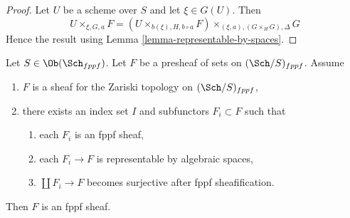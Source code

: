 \begin{proof}
Let $U$ be a scheme over $S$ and let $\xi \in G(U)$. Then
$$
U \times_{\xi, G, a} F =
(U \times_{b(\xi), H, b \circ a} F) \times_{(\xi, a), (G \times_H G), \Delta} G
$$
Hence the result using Lemma \ref{lemma-representable-by-spaces}.
\end{proof}

\begin{lemma}
\label{lemma-glueing-sheaves}
Let $S \in \Ob(\Sch_{fppf})$. Let $F$ be a presheaf of sets on
$(\Sch/S)_{fppf}$. Assume
\begin{enumerate}
\item $F$ is a sheaf for the Zariski topology on $(\Sch/S)_{fppf}$,
\item there exists an index set $I$ and subfunctors $F_i \subset F$ such that
\begin{enumerate}
\item each $F_i$ is an fppf sheaf,
\item each $F_i \to F$ is representable by algebraic spaces,
\item $\coprod F_i \to F$ becomes surjective after fppf sheafification.
\end{enumerate}
\end{enumerate}
Then $F$ is an fppf sheaf.
\end{lemma}

